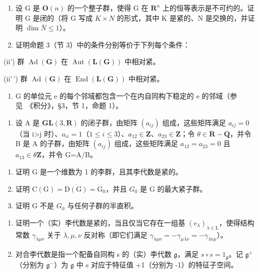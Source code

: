 \begin{enumerate}
\def\labelenumi{\arabic{enumi})}
\setcounter{enumi}{2}
\item
  设 G 是 \(\mathbf{O}(n)\) 的一个整子群，使得 G 在 \(\mathbf{R}^{n}\) 上的恒等表示是不可约的。证明 G 是闭的（将 G 写成 \(K \times N\) 的形式，其中 K 是紧的、N 是交换的，并证明 \(\dim \overline{N} \leq 1\)）。
\item
  证明命题 3（节 3）中的条件分别等价于下列每个条件：
\end{enumerate}

(ii') 群 \(\operatorname{Ad}(\mathbf{G})\) 在 \(\operatorname{Aut}(\mathbf{L}(\mathbf{G}))\) 中相对紧。

(ii'\,') 群 \(\operatorname{Ad}(\mathbf{G})\) 在 \(\operatorname{End}(\mathbf{L}(\mathbf{G}))\) 中相对紧。

\begin{enumerate}
\def\labelenumi{(\alph{enumi})}
\setcounter{enumi}{21}
\tightlist
\item
  G 的单位元 e 的每个邻域都包含一个在内自同构下稳定的 e 的邻域（参见~《积分》，§3，节 1，命题 1）。
\end{enumerate}

\begin{enumerate}
\def\labelenumi{\arabic{enumi})}
\setcounter{enumi}{4}
\tightlist
\item
  设 A 是 \(\mathbf{GL}(3,\mathbf{R})\) 的闭子群，由矩阵 \((a_{ij})\) 组成，这些矩阵满足 \(a_{ij}=0\)（当 i\textgreater j 时）、\(a_{ii}=1\)（\(1\leq i\leq3\)）、\(a_{12}\in \mathbf{Z}\)、\(a_{23}\in \mathbf{Z}\)；令 \(\theta\in \mathbf{R}-\mathbf{Q}\)，并令 B 是 A 的子群，由矩阵 \((a_{ij})\) 组成，这些矩阵满足 \(a_{12}=a_{23}=0\) 且 \(a_{13}\in\theta\mathbf{Z}\)，并令 G=A/B。
\end{enumerate}

\begin{enumerate}
\def\labelenumi{\alph{enumi})}
\item
  证明 G 是一个维数为 1 的李群，且其李代数是紧的。
\item
  证明 \(\mathrm{C}(\mathrm{G}) = \overline{\mathrm{D}(\mathrm{G})} = \mathrm{G}_{0}\)，并且 \(G_{0}\) 是 G 的最大紧子群。
\item
  证明 G 不是 \(G_{0}\) 与任何子群的半直积。
\end{enumerate}

\begin{enumerate}
\def\labelenumi{\arabic{enumi})}
\setcounter{enumi}{5}
\item
  证明一个（实）李代数是紧的，当且仅当它存在一组基 \((e_{\lambda})_{\lambda\in\mathrm{L}}\)，使得结构常数 \(\gamma_{\lambda\mu\nu}\) 关于 \(\lambda,\mu,\nu\) 反对称（即它们满足 \(\gamma_{\lambda\mu\nu}=-\gamma_{\mu\lambda\nu}=-\gamma_{\lambda\nu\mu}\)）。
\item
  对合李代数是指一个配备自同构 s 的（实）李代数 \(\mathfrak{g}\)，满足 \(s \circ s = 1_{\mathfrak{g}}\)。记 \(\mathfrak{g}^{+}\)（分别为 \(\mathfrak{g}^{-}\)）为 \(\mathfrak{g}\) 中 s 对应于特征值 +1（分别为 -1）的特征子空间。
\end{enumerate}

